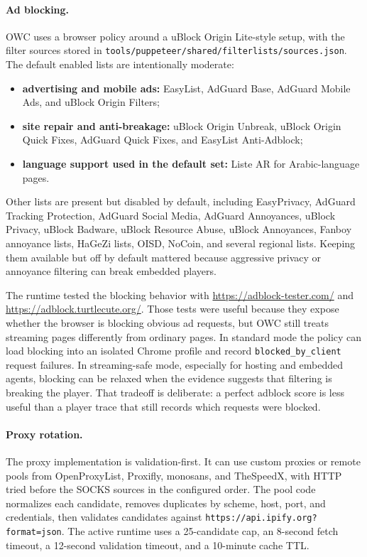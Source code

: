 \paragraph{Ad blocking.}
OWC uses a browser policy around a uBlock Origin Lite-style setup, with the filter
sources stored in \texttt{tools/puppeteer/shared/filterlists/sources.json}. The default
enabled lists are intentionally moderate:
\begin{itemize}
  \item \textbf{advertising and mobile ads:} EasyList, AdGuard Base, AdGuard Mobile Ads,
  and uBlock Origin Filters;
  \item \textbf{site repair and anti-breakage:} uBlock Origin Unbreak, uBlock Origin
  Quick Fixes, AdGuard Quick Fixes, and EasyList Anti-Adblock;
  \item \textbf{language support used in the default set:} Liste AR for Arabic-language
  pages.
\end{itemize}
Other lists are present but disabled by default, including EasyPrivacy, AdGuard Tracking
Protection, AdGuard Social Media, AdGuard Annoyances, uBlock Privacy, uBlock Badware,
uBlock Resource Abuse, uBlock Annoyances, Fanboy annoyance lists, HaGeZi lists, OISD,
NoCoin, and several regional lists. Keeping them available but off by default mattered
because aggressive privacy or annoyance filtering can break embedded players.

The runtime tested the blocking behavior with \url{https://adblock-tester.com/} and
\url{https://adblock.turtlecute.org/}. Those tests were useful because they expose
whether the browser is blocking obvious ad requests, but OWC still treats streaming
pages differently from ordinary pages. In standard mode the policy can load blocking
into an isolated Chrome profile and record \texttt{blocked\_by\_client} request
failures. In streaming-safe mode, especially for hosting and embedded agents, blocking
can be relaxed when the evidence suggests that filtering is breaking the player. That
tradeoff is deliberate: a perfect adblock score is less useful than a player trace that
still records which requests were blocked.

\paragraph{Proxy rotation.}
The proxy implementation is validation-first. It can use custom proxies or remote pools
from OpenProxyList, Proxifly, monosans, and TheSpeedX, with HTTP tried before the SOCKS
sources in the configured order. The pool code normalizes each candidate, removes
duplicates by scheme, host, port, and credentials, then validates candidates against
\texttt{https://api.ipify.org?format=json}. The active runtime uses a 25-candidate cap,
an 8-second fetch timeout, a 12-second validation timeout, and a 10-minute cache TTL.

